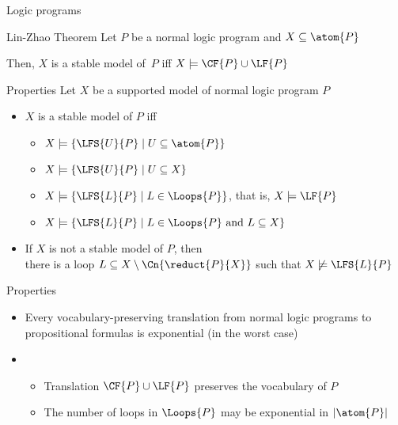 \begin{frame}{Logic programs}
  \bigskip
  \begin{center}
    \begin{minipage}[t]{0.8\linewidth}
      \begin{block}{Lin-Zhao Theorem}
        Let $P$ be a normal logic program and $X\subseteq\atom{P}$
        \par\medskip
        Then, $X$ is a stable model of~$P$ iff $X\models\CF{P}\cup\LF{P}$
      \end{block}
    \end{minipage}
  \end{center}
\end{frame}
\begin{frame}{Properties}
  \bigskip
  Let $X$ be a supported model of normal logic program $P$
  \medskip
  \begin{itemize}
  \item<2-> $X$ is a stable model of $P$ iff
    \smallskip
    \begin{itemize}\normalsize
    \item $X\models\{  \LFS{U}{P} \mid U\subseteq\atom{P}  \}$
    \item $X\models\{  \LFS{U}{P} \mid U\subseteq X  \}$
    \item $X\models\{  \LFS{L}{P} \mid L\in\Loops{P}  \}$, that is, $X\models\LF{P}$
    \item $X\models\{  \LFS{L}{P} \mid L\in\Loops{P}\text{ and } L\subseteq X  \}$
    \end{itemize}
    \medskip
  \item<3-> If $X$ is not a stable model of $P$, then\\
    there is a loop $L \subseteq X \setminus \Cn{\reduct{P}{X}}$ such that $X \not\models \LFS{L}{P}$
  \end{itemize}
\end{frame}
\begin{frame}{Properties}
  \bigskip
  \begin{itemize}
  \item<1-> Every vocabulary-preserving translation from normal logic programs to
    propositional formulas is exponential (in the worst case)
    \medskip
  \item<2-> \
    \begin{itemize}\normalsize
    \item Translation $\CF{P}\cup\LF{P}$ preserves the vocabulary of $P$
      \smallskip
    \item The number of loops in $\Loops{P}$ may be exponential in $|\atom{P}|$
    \end{itemize}
  \end{itemize}
\end{frame}
%
